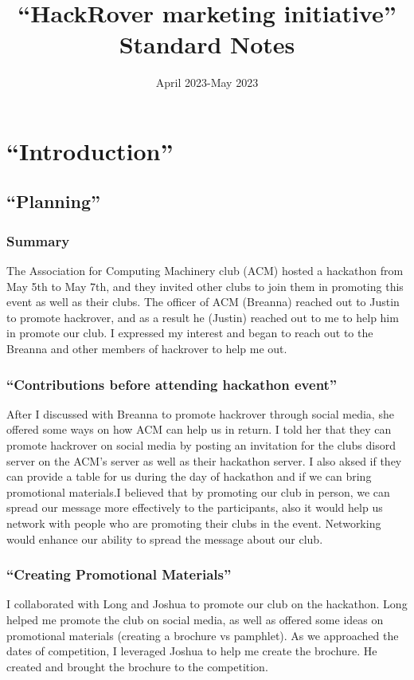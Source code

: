 \documentclass[a4paper, 10pt]{article}
\title{``HackRover marketing initiative'' Standard Notes}
\date{April 2023-May 2023}
\begin{document}
\maketitle

\pagebreak

\tableofcontents



\pagebreak

\section{``Introduction''}
\subsection{``Planning''}
\subsubsection*{Summary}
The Association for Computing Machinery club (ACM) hosted a hackathon from May 5th to May 7th, and they invited other clubs to join them in promoting this event as well as their clubs. The officer of ACM (Breanna) reached out to Justin to promote hackrover, and as a result he (Justin) reached out to me to help him in promote our club. I expressed my interest and began to reach out to the Breanna and other members of hackrover to help me out.

\subsubsection*{``Contributions before attending hackathon event''}
After I discussed with Breanna to promote hackrover through social media, she offered some ways on how ACM can help us in return. I told her that they can promote hackrover on social media by posting an invitation for the clubs disord server on the ACM's server as well as their hackathon server. I also aksed if they can provide a table for us during the day of hackathon and if we can bring promotional materials.I believed that by promoting our club in person, we can spread our message more effectively to the participants, also it would help us network with people who are promoting their clubs in the event. Networking would enhance our ability to spread the message about our club.

\subsubsection{``Creating Promotional Materials''}
I collaborated with Long and Joshua to promote our club on the hackathon. Long helped me promote the club on social media, as well as offered some ideas on promotional materials (creating a brochure vs pamphlet). As we approached the dates of competition, I leveraged Joshua to help me create the brochure. He created and brought the brochure to the competition.
\end{document}
